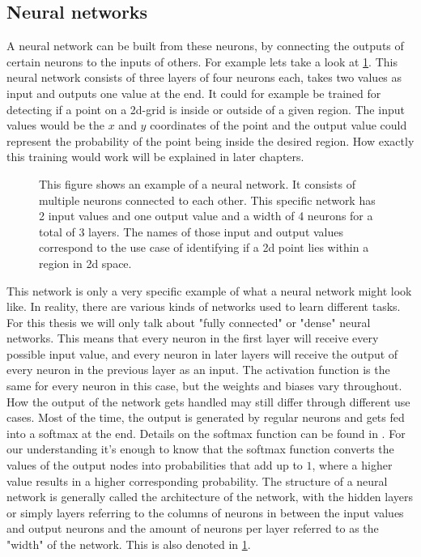 \subsection{Neural networks}\label{sec:NeuralNetworks}
A neural network can be built from these neurons, by connecting the outputs of certain neurons to the inputs of others. For example lets take a look at \cref{fig:Neural_network_example}. This neural network consists of three layers of four neurons each, takes two values as input and outputs one value at the end. It could for example be trained for detecting if a point on a 2d-grid is inside or outside of a given region. The input values would be the $x$ and $y$ coordinates of the point and the output value could represent the probability of the point being inside the desired region. How exactly this training would work will be explained in later chapters. \\
\begin{figure}
	\centering
	
	\caption{This figure shows an example of a neural network. It consists of multiple neurons connected to each other. This specific network has 2 input values and one output value and a width of 4 neurons for a total of 3 layers. The names of those input and output values correspond to the use case of identifying if a 2d point lies within a region in 2d space.}
	\label{fig:Neural_network_example}
\end{figure}
This network is only a very specific example of what a neural network might look like. In reality, there are various kinds of networks used to learn different tasks. For this thesis we will only talk about "fully connected" or "dense" neural networks. This means that every neuron in the first layer will receive every possible input value, and every neuron in later layers will receive the output of every neuron in the previous layer as an input. The activation function is the same for every neuron in this case, but the weights and biases vary throughout. How the output of the network gets handled may still differ through different use cases. Most of the time, the output is generated by regular neurons and gets fed into a softmax at the end. Details on the softmax function can be found in \cite{gao2018properties}. For our understanding it's enough to know that the softmax function converts the values of the output nodes into probabilities that add up to $1$, where a higher value results in a higher corresponding probability. The structure of a neural network is generally called the architecture of the network, with the hidden layers or simply layers referring to the columns of neurons in between the input values and output neurons and the amount of neurons per layer referred to as the "width" of the network. This is also denoted in \cref{fig:Neural_network_example}. 
